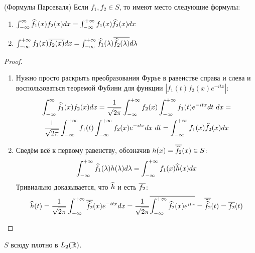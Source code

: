 \begin{theorem} (Формулы Парсеваля)
	Если $f_1, f_2 \in S$, то имеют место следующие формулы:
	\begin{enumerate}
		\item \(\int_{-\infty}^\infty \widehat{f}_1(x)f_2(x)dx = \int_{-\infty}^{+\infty} f_1(x)\widehat{f}_2(x)dx\)
		
		\item \(\int_{-\infty}^{+\infty} f_1(x)\overline{f_2(x)}dx = \int_{-\infty}^{+\infty} \widehat{f}_1(\lambda)\overline{\widehat{f}_2(\lambda)}d\lambda\)
	\end{enumerate}
\end{theorem}

\begin{proof}~
	\begin{enumerate}
		\item Нужно просто раскрыть преобразования Фурье в равенстве справа и слева и воспользоваться теоремой Фубини для функции $|f_1(t) f_2(x) e^{-itx}|$:
		\begin{multline*}
			\int_{-\infty}^\infty \widehat{f}_1(x)f_2(x)dx = \frac{1}{\sqrt{2\pi}} \int_{-\infty}^{+\infty} f_2(x) \int_{-\infty}^{+\infty} f_1(t) e^{-itx} dt \ dx = \\ \frac{1}{\sqrt{2\pi}} \int_{-\infty}^{+\infty} f_1(t) \int_{-\infty}^{+\infty} f_2(x) e^{-itx} dx \ dt = \int_{-\infty}^{+\infty} f_1(x)\widehat{f}_2(x)dx
		\end{multline*}
		
		\item Сведём всё к первому равенству, обозначив $h(x) = \overline{\widehat f_2}(x) \in S$:
		\[
			\int_{-\infty}^{+\infty} \widehat{f}_1(\lambda)h(\lambda) d\lambda = \int_{-\infty}^{+\infty} f_1(x)\widehat{h}(x)dx
		\]
		Тривиально доказывается, что $\widehat h$ и есть $\overline{f_2}$:
		\[
			\widehat{h}(t) = \frac{1}{\sqrt{2\pi}} \int_{-\infty}^{+\infty} \overline{\widehat f_2}(x) e^{-itx} dx = \frac{1}{\sqrt{2\pi}} \overline{\int_{-\infty}^{+\infty} \widehat f_2(x) e^{itx}} = \overline{\widetilde{\widehat f_2}}(t) = \overline{f_2}(t)
		\]
	\end{enumerate}
\end{proof}

\begin{lemma}
	$S$ всюду плотно в $L_2(\mathbb{R})$.
\end{lemma}

